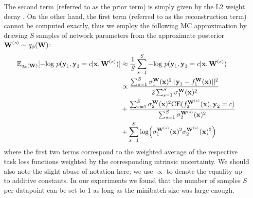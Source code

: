 The second term (referred to as the prior term) is simply given by the L2 weight decay \cite{gal2015dropout}. On the other hand, the first term (referred to as the reconstruction term) cannot be computed exactly, thus we employ the following MC approximation by drawing $S$ samples of network parameters from the approximate posterior $\text{\textbf{W}}^{(s)} \sim q_{\phi}(\text{\textbf{W}})$:
\begin{align*}\label{eq:reconstruction}
\mathbb{E}_{q_{\phi}(\text{\textbf{W}})}[- \text{log }p(\textbf{y}_{1},\textbf{y}_{2}=c|\mathbf{x},\text{\textbf{W}}^{(s)})] 
&\approx \frac{1}{S}\sum_{s=1}^{S} - \text{log }p(\textbf{y}_{1},\textbf{y}_{2}=c|\mathbf{x},\text{\textbf{W}}^{(s)}) \\
&\propto 
\frac{\sum_{s=1}^{S}\sigma_{1}^{\text{\textbf{W}}}(\text{\textbf{x}})^{2}||\text{\textbf{y}}_{1}-f^{\text{\textbf{W}}}_1(\text{\textbf{x}})||^{2}}{2\sum_{s=1}^{S}\sigma_{1}^{\text{\textbf{W}}}(\text{\textbf{x}})^{2}} \\
&+\frac{\sum_{s=1}^{S}\sigma_{2}^{\text{\textbf{W}}}(\text{\textbf{x}})^{2}\text{CE}(f_{2}^{\text{\textbf{W}}^{(s)}}(\text{\textbf{x}}),\text{\textbf{y}}_{2}=c)}{\sum_{s=1}^{S}\sigma^{\mathbf{W}^{(s)}}_{2}(\text{\textbf{x}})^2} \\
&+\sum_{s=1}^{S}\text{log}\Big{(}\sigma^{\mathbf{W}^{(s)}}_{1}(\text{\textbf{x}})^2\sigma^{\mathbf{W}^{(s)}}_{2}(\text{\textbf{x}})^2\Big{)} 
\end{align*}
where the first two terms correspond to the weighted average of the respective task loss functions weighted by the corresponding intrinsic uncertainty. We should also note the slight abuse of notation here; we use $\propto$ to denote the equality up to additive constants. In our experiments we found that the number of samples $S$ per datapoint can be set to 1 as long as the minibatch size was large enough. 

%


